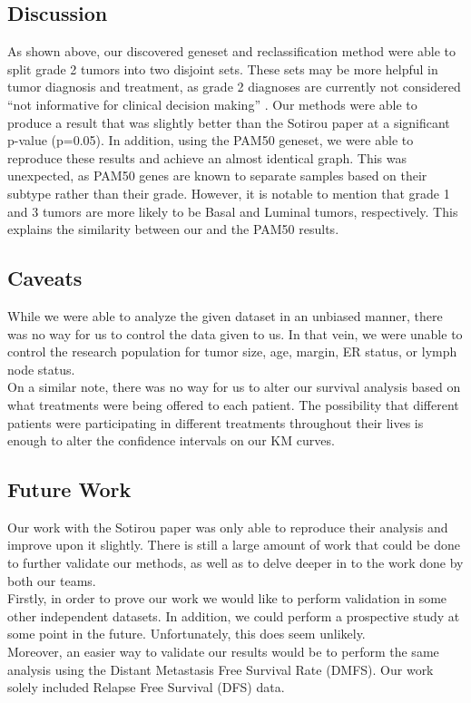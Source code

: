 \documentclass[a4paper,10pt]{article}
\begin{document}
\subsection{Discussion}
As shown above, our discovered geneset and reclassification method were 
able to split grade 2 tumors into two disjoint sets. These sets may be more 
helpful in tumor diagnosis and treatment, as grade 2 diagnoses are currently
 not considered “not informative for clinical decision making” \cite{Sotiriou1}.
Our methods were able to produce a result that was slightly better than the 
Sotirou paper at a significant p-value (p=0.05). In addition, using the PAM50
 geneset, we were able to reproduce these results and achieve an almost 
identical graph. This was unexpected, as PAM50 genes are known to 
separate samples based on their subtype rather than their grade. However, 
it is notable to mention that grade 1 and 3 tumors are more likely to be Basal 
and Luminal tumors, respectively. This explains the similarity between our 
and the PAM50 results.
\subsection{Caveats}
While we were able to analyze the given dataset in an unbiased manner, 
there was no way for us to control the data given to us. In that vein, we 
were unable to control the research population for tumor size, age, 
margin, ER status, or lymph node status.\\

On a similar note, there was no way for us to alter our survival analysis 
based on what treatments were being offered to each patient. The 
possibility that different patients were participating in different treatments 
throughout their lives is enough to alter the confidence intervals on our KM 
curves.
\subsection{Future Work}
Our work with the Sotirou paper was only able to reproduce their analysis 
and improve upon it slightly. There is still a large amount of work that could 
be done to further validate our methods, as well as to delve deeper in to the 
work done by both our teams.\\

Firstly, in order to prove our work we would like to perform validation in
 some other independent datasets. In addition, we could perform a 
prospective study at some point in the future. Unfortunately, this does seem 
unlikely.\\

Moreover, an easier way to validate our results would be to perform the same 
analysis using the Distant Metastasis Free Survival Rate (DMFS). Our work 
solely included Relapse Free Survival (DFS) data.


 \markright{ }
\end{document}
